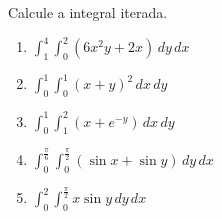 \documentclass[a4paper, 12pt]{article}
\begin{document}
	
	
	\vspace{5mm}
	
	Calcule a integral iterada.
	
	\begin{enumerate}
		
		\item $\displaystyle \int_{1}^{4} \int_{0}^{2} (6x^{2}y + 2x) \, dy \, dx$ 
		
		\item $\displaystyle \int_{0}^{1} \int_{0}^{1} (x + y)^2 \, dx \, dy$ 
		
		\item $\displaystyle \int_{0}^{1} \int_{1}^{2} (x + e^{-y}) \, dx \, dy$ 
		
		\item $\displaystyle \int_{0}^{\frac{\pi}{6}} \int_{0}^{\frac{\pi}{2}} (\sin x + \sin y) \, dy \, dx$ 
		
		\item $\displaystyle \int_{0}^{2} \int_{0}^{\frac{\pi}{2}} x \sin y \, dy \, dx$ 
		
	\end{enumerate}
		
	\vspace{5mm}	
	
\end{document}
